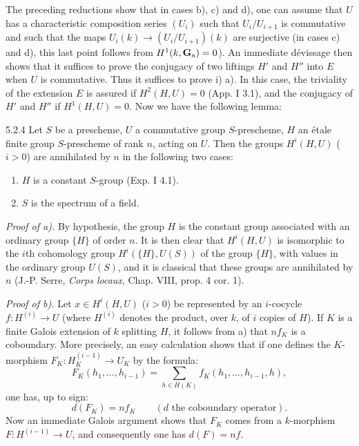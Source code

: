 The preceding reductions show that in cases b), c) and d), one can assume that $U$ has a characteristic composition series $(U_i)$ such that $U_i/U_{i+1}$ is commutative and such that the maps $U_i(k)\to(U_i/U_{i+1})(k)$ are surjective (in cases c) and d), this last point follows from $H^1(k,\mathbf{G}_{\mathrm{a}})=0$). An immediate dévissage then shows that it suffices to prove the conjugacy of two liftings $H'$ and $H''$ into $E$ when $U$ is commutative. Thus it suffices to prove i) a). In this case, the triviality of the extension $E$ is assured if $H^2(H,U)=0$ (App. I 3.1), and the conjugacy of $H'$ and $H''$ if $H^1(H,U)=0$. Now we have the following lemma:
\begin{lemma}{5.2.4}\label{XVII.5.2.4}
Let $S$ be a prescheme, $U$ a commutative group $S$-prescheme, $H$ an étale finite group $S$-prescheme of rank $n$, acting on $U$. Then the groups $H^i(H,U)$ ($i>0$) are annihilated by $n$ in the following two cases:
\begin{enumerate}[label=\textup{\alph*)}]
\item $H$ is a constant $S$-group (Exp. I 4.1).
\item $S$ is the spectrum of a field.
\end{enumerate}
\end{lemma}
\noindent\emph{Proof of a).} By hypothesis, the group $H$ is the constant group associated with an ordinary group $\{H\}$ of order $n$. It is then clear that $H^i(H,U)$ is isomorphic to the $i$th cohomology group $H^i(\{H\},U(S))$ of the group $\{H\}$, with values in the ordinary group $U(S)$, and it is classical that these groups are annihilated by $n$ (J.-P. Serre, \emph{Corps locaux}, Chap. VIII, prop. 4 cor. 1).

\noindent\emph{Proof of b).} Let $x\in H^i(H,U)$ ($i>0$) be represented by an $i$-cocycle $f:H^{(i)}\to U$ (where $H^{(i)}$ denotes the product, over $k$, of $i$ copies of $H$). If $K$ is a finite Galois extension of $k$ splitting $H$, it follows from a) that $nf_K$ is a coboundary. More precisely, an easy calculation shows that if one defines the $K$-morphism $F_K:H_K^{(i-1)}\to U_K$ by the formula:
\[
 F_K(h_1,\ldots,h_{i-1})=\sum_{h\in H(K)}f_K(h_1,\ldots,h_{i-1},h),
\]
one has, up to sign:
\[
 d(F_K)=nf_K\qquad(d\text{ the coboundary operator}).
\]
Now an immediate Galois argument shows that $F_K$ comes from a $k$-morphism $F:H^{(i-1)}\to U$, and consequently one has $d(F)=nf$.


